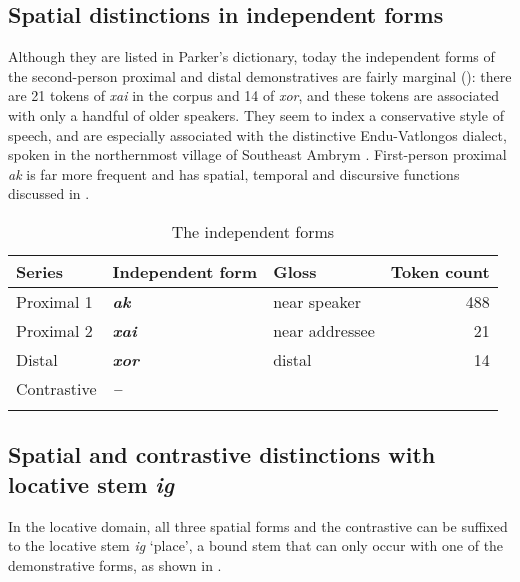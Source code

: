 \documentclass[output=paper,colorlinks,citecolor=brown]{langscibook}
\begin{document}
\subsection{Spatial distinctions in independent forms}
\label{sec:ridge:2.2}

Although they are listed in Parker’s dictionary, today the independent forms of the second-person proximal and distal demonstratives are fairly marginal (): there are 21 tokens of \textit{xai} in the corpus and 14 of \textit{xor}, and these tokens are associated with only a handful of older speakers. They seem to index a conservative style of speech, and are especially associated with the distinctive Endu-Vatlongos dialect, spoken in the northernmost village of Southeast Ambrym \citep{Ridge2018Contexts}. First-person proximal \textit{ak} is far more frequent and has spatial, temporal and discursive functions discussed in .

\begin{table}
\caption{The independent forms}
\label{tab:ridge:4}
\begin{tabularx}{\textwidth}{XlXr}
\lsptoprule
\textbf{Series} & \textbf{Independent form} & \textbf{Gloss} & \textbf{Token count}\\
\midrule
{Proximal 1} & {\textbf{\textit{ak}}} & {near speaker} & {488}\\
{Proximal 2} & {\textbf{\textit{xai}}} & {near addressee} & {21}\\
{Distal} & {\textbf{\textit{xor}}} & {distal} & {14}\\
{Contrastive} & {\textbf{\textit{–}}} &  & \\
\lspbottomrule
\end{tabularx}
\end{table}

\subsection{Spatial and contrastive distinctions with locative stem \textit{ig}}
\label{sec:ridge:2.3}

In the locative domain, all three spatial forms and the contrastive can be suffixed to the locative stem \textit{ig} ‘place’, a bound stem that can only occur with one of the demonstrative forms, as shown in .
\end{document}
